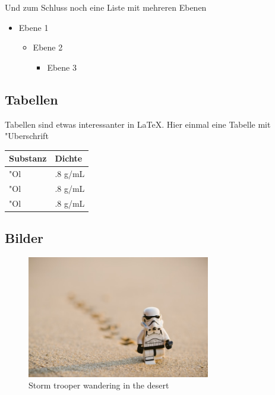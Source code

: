 \documentclass[a4paper,11pt,titlepage]{article}
\begin{document}
    \noindent Und zum Schluss noch eine Liste mit mehreren Ebenen
    \begin{itemize}
        \item Ebene 1
        \begin{itemize}
            \item Ebene 2
            \begin{itemize}
                \item Ebene 3
            \end{itemize}
        \end{itemize}
    \end{itemize}

    \subsection{Tabellen}
    Tabellen sind etwas interessanter in LaTeX. Hier einmal eine Tabelle mit "Uberschrift

    \begin{center}
        \begin{tabular}{ | l | p{5 cm} |}
            \hline
            Substanz & Dichte  \\ \hline
            "Ol      & .8 g/mL \\ \hline
            "Ol      & .8 g/mL \\ \hline
            "Ol      & .8 g/mL \\ \hline
        \end{tabular}
    \end{center}

    \subsection{Bilder}
    \begin{figure}
        \centering
        \includegraphics[width=8cm]{./images/start-wars-desert}
        \caption{Storm trooper wandering in the desert}
        \label{fig:star-wars}
    \end{figure}
\end{document}
